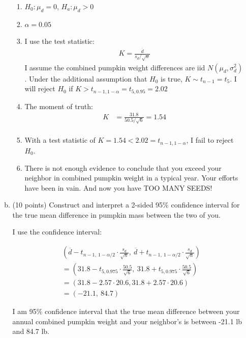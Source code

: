 \documentclass{article}\usepackage{graphicx, color}
\providecommand{\ov}[1]{\overline{#1}}
\numberwithin{equation}{section}
\begin{document}
\begin{flushleft}
\begin{enumerate}[1. ]
\begin{enumerate}[a. ]
{\begin{enumerate}[1. ]
\item $H_0: \mu_d = 0$, $H_a: \mu_d > 0$
\item $\alpha = 0.05$
\item I use the test statistic:
\begin{align*}
K = \frac{\ov{d}}{s_d/\sqrt{n}}
\end{align*}
I assume the combined pumpkin weight differences are iid $N(\mu_d, \sigma_d^2)$. Under the additional assumption that $H_0$ is true, $K \sim t_{n - 1} = t_5$. I will reject $H_0$ if $K > t_{n - 1, 1 - \alpha} = t_{5, 0.95} = 2.02$
\item The moment of truth:
\begin{align*}
K &= \frac{31.8}{50.5/\sqrt{6}} = 1.54 \\
\end{align*} 
\item With a test statistic of $K =1.54  < 2.02 = t_{n - 1, 1 - \alpha}$, I fail to reject $H_0$. 
\item There is not enough evidence to conclude that you exceed your neighbor in combined pumpkin weight in a typical year. Your efforts have been in vain. And now you have TOO MANY SEEDS!
\end{enumerate}}

\item (10 points) Construct and interpret a 2-sided 95\% confidence interval for the true mean difference in pumpkin mass between the two of you.

{\color{red}

I use the confidence interval: 

\begin{align*}
&(\ov{d} - t_{n - 1, \ 1 - \alpha/2} \cdot \frac{s_d}{\sqrt{n}}, \ \ov{d} + t_{n - 1, \ 1 - \alpha/2} \cdot \frac{s_d}{\sqrt{n}}) \\
&= (31.8 - t_{5, 0.975} \cdot \frac{50.5}{\sqrt{6}} , \ 31.8 + t_{5, 0.975} \cdot \frac{50.5}{\sqrt{6}} )\\
&= (31.8 - 2.57 \cdot 20.6, 31.8 + 2.57 \cdot  20.6) \\
&= (-21.1, \  84.7)
\end{align*}

I am 95\% confidence interval that the true mean difference between your annual combined pumpkin weight and your neighbor's is between -21.1 lb and 84.7 lb. 
}


\end{enumerate}



\end{enumerate}
\end{flushleft}
\end{document}
